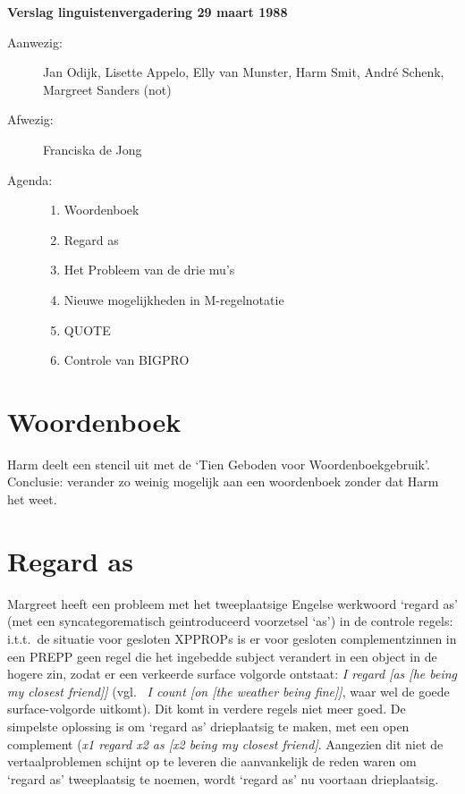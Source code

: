 
   \RosSupersedes{-}
   \MakeRosTitle

\noindent
{\bf Verslag linguistenvergadering 29 maart 1988}
\begin{description}
\item[Aanwezig:] Jan Odijk, Lisette Appelo, Elly van Munster, Harm Smit, 
Andr\'{e} Schenk, Margreet Sanders (not)
\item[Afwezig:] Franciska de Jong
\item[Agenda:] \mbox{}
\begin{enumerate}
\item Woordenboek
\item Regard as
\item Het Probleem van de drie mu's
\item Nieuwe mogelijkheden in M-regelnotatie
\item QUOTE
\item Controle van BIGPRO
\end{enumerate}
\end{description}

\section{Woordenboek}
Harm deelt een stencil uit met de `Tien Geboden voor Woordenboekgebruik'. 
Conclusie: verander zo weinig mogelijk aan een woordenboek zonder dat Harm het 
weet.

\section{Regard as}
Margreet heeft een probleem met het tweeplaatsige Engelse werkwoord `regard as' 
(met een syncategorematisch geintroduceerd voorzetsel `as') in de controle 
regels: i.t.t.\ de situatie voor gesloten XPPROPs is er voor gesloten 
complementzinnen in een PREPP geen regel die het ingebedde
subject verandert in een object in de hogere zin, zodat er een verkeerde surface 
volgorde ontstaat: {\em I regard [as [he being my closest friend]]\/} (vgl.\ 
{\em
I count [on [the weather being fine]]\/}, waar wel de goede surface-volgorde 
uitkomt). 
Dit komt in verdere regels niet meer goed. De simpelste oplossing is om `regard 
as' drieplaatsig te maken, met een open complement ({\em x1 regard x2 as [x2 
being my closest friend]\/}. Aangezien dit niet de vertaalproblemen schijnt op 
te leveren die aanvankelijk de reden waren om `regard as' tweeplaatsig te 
noemen, wordt `regard as' nu voortaan drieplaatsig.

